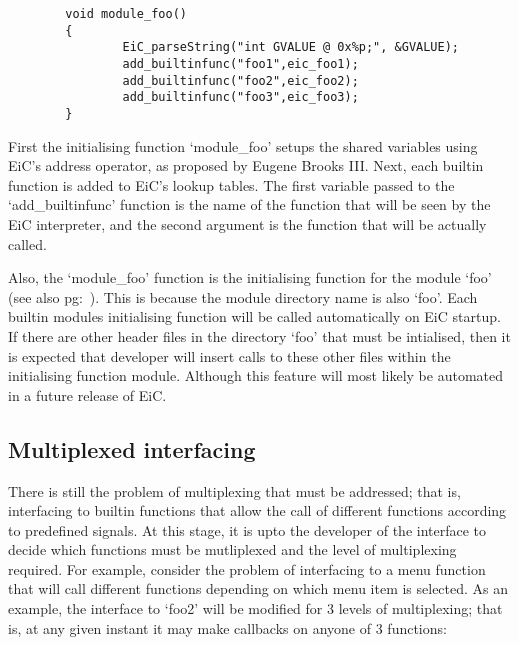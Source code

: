\small
\begin{verbatim}
        void module_foo()
        {
                EiC_parseString("int GVALUE @ 0x%p;", &GVALUE);
                add_builtinfunc("foo1",eic_foo1);
                add_builtinfunc("foo2",eic_foo2);
                add_builtinfunc("foo3",eic_foo3);
        }
\end{verbatim}
\normalsize


First the initialising function `module\_foo' setups the shared
variables using EiC's address operator, as proposed by Eugene Brooks
III. Next, each builtin function is added to EiC's lookup tables.  The
first variable passed to the `add\_builtinfunc' function is the name
of the function that will be seen by the EiC interpreter, and the
second argument is the function that will be actually called.

Also, the `module\_foo' function is the initialising function for the
module `foo' (see also pg:~\pageref{sec:module_names}).  This is
because the module directory name is also `foo'. Each builtin modules
initialising function will be called automatically on EiC startup. If
there are other header files in the directory `foo' that must be
intialised, then it is expected that developer will insert calls to
these other files within the initialising function module. Although
this feature will most likely be automated in a future release of
EiC.


\subsection{Multiplexed interfacing}
\label{sec:muliplexed_interface}

There is still the problem of multiplexing that must be addressed;
that is, interfacing to builtin functions that allow the call of
different functions according to predefined signals. At this stage, it
is upto the developer of the interface to decide which functions must
be mutliplexed and the level of multiplexing required. For example,
consider the problem of interfacing to a menu function that will call
different functions depending on which menu item is selected. As an
example, the interface to `foo2' will be modified for 3 levels of
multiplexing; that is, at any given instant it may make callbacks on
anyone of 3 functions:

